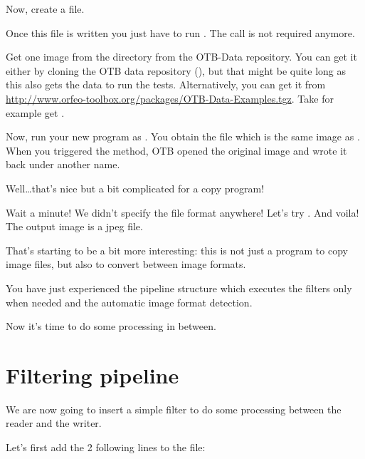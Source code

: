 

Now, create a  file.



Once this file is written you just have to run . The
 call is not required anymore.

Get one image from the  directory from the OTB-Data
repository. You can get it either by cloning the OTB data repository 
(), but that might be quite 
long as this also gets the data to run the tests. Alternatively, you can get it from 
\url{http://www.orfeo-toolbox.org/packages/OTB-Data-Examples.tgz}.
Take for example get .

Now, run your new program as . You
obtain the file  which is the same image as
. When you triggered the  method, OTB opened
the original image and wrote it back under another name.

Well\ldots that's nice but a bit complicated for a copy program!

Wait a minute! We didn't specify the file format anywhere! Let's try
. And voila! The output image is a jpeg
file.

That's starting to be a bit more interesting: this is not just a program to copy
image files, but also to convert between image formats.

You have just experienced the pipeline structure which executes the
filters only when needed and the automatic image format detection.

Now it's time to do some processing in between.


\section{Filtering pipeline}
\label{sec:TutorialFiltering}


We are now going to insert a simple filter to do some processing between the
reader and the writer.

Let's first add the 2 following lines to the  file:

